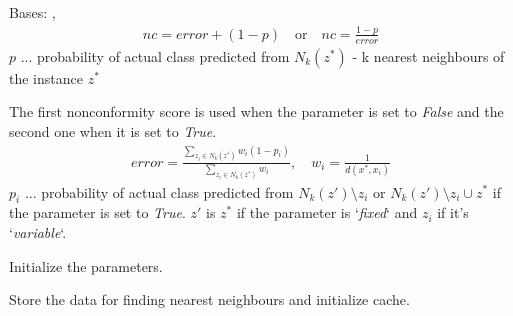 \documentclass[letterpaper,10pt,english]{sphinxmanual}
\begin{document}

\begin{fulllineitems}
\label{cp.nonconformity:cp.nonconformity.LOOClassNC}
Bases: {\hyperref[cp.nonconformity:cp.nonconformity.NearestNeighbours]{}}, {\hyperref[cp.nonconformity:cp.nonconformity.ClassNC]{}}
\begin{equation*}
\begin{split}\mathit{nc} = \mathit{error} + (1 - p)
\quad \text{or} \quad
\mathit{nc} = \frac{1 - p}{\mathit{error}}\end{split}
\end{equation*}
\(p\) ... probability of actual class predicted from \(N_k(z^*)\) - k nearest neighbours
of the instance \(z^*\)

The first nonconformity score is used when the parameter  is set to \emph{False}
and the second one when it is set to \emph{True}.
\begin{equation*}
\begin{split}\mathit{error} = \frac {\sum_{z_i \in N_k(z^*)} w_i (1 - p_i)} {\sum_{z_i \in N_k(z^*)} w_i},
\quad w_i = \frac{1}{d(x^*, x_i)}\end{split}
\end{equation*}
\(p_i\) ... probability of actual class predicted from \(N_k(z') \setminus z_i\) or
\(N_k(z') \setminus z_i \cup z^*\) if the parameter  is set to \emph{True}. \(z'\) is
\(z^*\) if the  parameter is `\emph{fixed}` and \(z_i\) if it's `\emph{variable}`.

\begin{fulllineitems}
\label{cp.nonconformity:cp.nonconformity.LOOClassNC.__init__}
Initialize the parameters.

\end{fulllineitems}


\begin{fulllineitems}
\label{cp.nonconformity:cp.nonconformity.LOOClassNC.fit}
Store the data for finding nearest neighbours and initialize cache.


\end{fulllineitems}
\end{fulllineitems}
\end{document}
